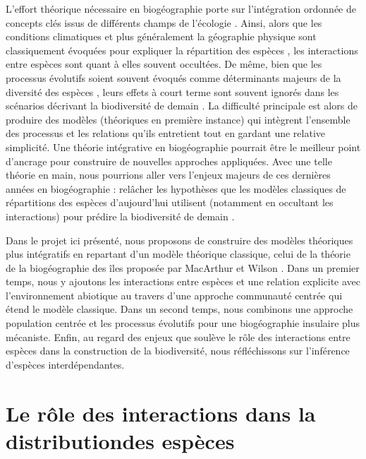 L'effort théorique nécessaire en biogéographie porte sur l'intégration
ordonnée de concepts clés issus de différents champs de l'écologie
\cite{Thuiller2013}. Ainsi, alors que les conditions climatiques et plus
généralement la géographie physique sont classiquement évoquées pour
expliquer la répartition des espèces \cite{Kearney2004}, les
interactions entre espèces sont quant à elles souvent occultées. De
même, bien que les processus évolutifs soient souvent évoqués comme
déterminants majeurs de la diversité des espèces \cite{Rosindell2011},
leurs effets à court terme sont souvent ignorés \cite{Parmesan2006} dans
les scénarios décrivant la biodiversité de demain \cite{Lavergne2010}.
La difficulté principale est alors de produire des modèles (théoriques
en première instance) qui intègrent l'ensemble des processus et les
relations qu'ils entretient \cite{Thuiller2013} tout en gardant une
relative simplicité. Une théorie intégrative en biogéographie pourrait
être le meilleur point d'ancrage pour construire de nouvelles approches
appliquées. Avec une telle théorie en main, nous pourrions aller vers
l'enjeux majeurs de ces dernières années en biogéographie : relâcher les
hypothèses que les modèles classiques de répartitions des espèces
d'aujourd'hui utilisent (notamment en occultant les interactions) pour
prédire la biodiversité de demain \cite{Guisan2011}.

Dans le projet ici présenté, nous proposons de construire des modèles
théoriques plus intégratifs en repartant d'un modèle théorique
classique, celui de la théorie de la biogéographie des îles proposée par
MacArthur et Wilson \cite{MacArthur1967}. Dans un premier temps, nous y
ajoutons les interactions entre espèces et une relation explicite avec
l'environnement abiotique au travers d'une approche communauté centrée
qui étend le modèle classique. Dans un second temps, nous combinons une
approche population centrée et les processus évolutifs pour une
biogéographie insulaire plus mécaniste. Enfin, au regard des enjeux que
soulève le rôle des interactions entre espèces dans la construction de
la biodiversité, nous réfléchissons sur l'inférence d'espèces
interdépendantes.

\section*{Le rôle des interactions dans la distributiondes
espèces}\label{le-ruxf4le-des-interactions-dans-la-distributiondes-espuxe8ces}

